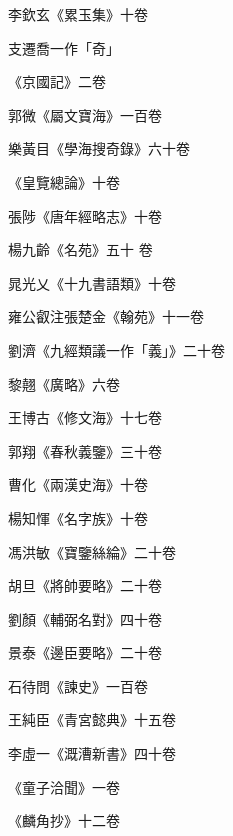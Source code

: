 \begin{pinyinscope}
 李欽玄《累玉集》十卷



 支遷喬一作「奇」



 《京國記》二卷



 郭微《屬文寶海》一百卷



 樂黃目《學海搜奇錄》六十卷



 《皇覽總論》十卷



 張陟《唐年經略志》十卷



 楊九齡《名苑》五十
 卷



 晁光乂《十九書語類》十卷



 雍公叡注張楚金《翰苑》十一卷



 劉濟《九經類議一作「義」》二十卷



 黎翹《廣略》六卷



 王博古《修文海》十七卷



 郭翔《春秋義鑒》三十卷



 曹化《兩漢史海》十卷



 楊知惲《名字族》十卷



 馮洪敏《寶鑒絲綸》二十卷



 胡旦《將帥要略》二十卷



 劉顏《輔弼名對》四十卷



 景泰《邊臣要略》二十卷



 石待問《諫史》一百卷



 王純臣《青宮懿典》十五卷



 李虛一《溉漕新書》四十卷



 《童子洽聞》一卷



 《麟角抄》十二卷




\end{pinyinscope}
